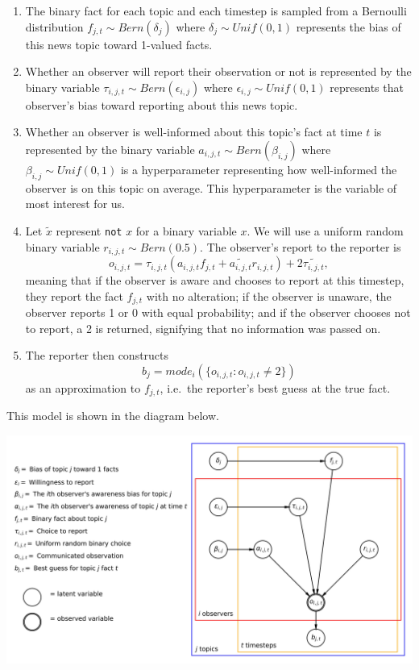 \documentclass[11pt]{article}
\providecommand{\tightlist}{%
      \setlength{\itemsep}{0pt}\setlength{\parskip}{0pt}}
\begin{document}
\begin{enumerate}
\def\labelenumi{\arabic{enumi}.}
\tightlist
\item
  The binary fact for each topic and each timestep is sampled from a
  Bernoulli distribution \(f_{j,t} \sim Bern(\delta_j)\) where
  \(\delta_j\sim Unif(0,1)\) represents the bias of this news topic
  toward 1-valued facts.
\item
  Whether an observer will report their observation or not is
  represented by the binary variable
  \(\tau_{i,j,t} \sim Bern(\epsilon_{i,j})\) where
  \(\epsilon_{i,j}\sim Unif(0,1)\) represents that observer's bias
  toward reporting about this news topic.
\item
  Whether an observer is well-informed about this topic's fact at time
  \(t\) is represented by the binary variable
  \(a_{i,j,t} \sim Bern(\beta_{i,j})\) where
  \(\beta_{i,j}\sim Unif(0,1)\) is a hyperparameter representing how
  well-informed the observer is on this topic on average. This
  hyperparameter is the variable of most interest for us.
\item
  Let \(\tilde{x}\) represent \texttt{not} \(x\) for a binary variable
  \(x\). We will use a uniform random binary variable
  \(r_{i,j,t} \sim Bern(0.5)\). The observer's report to the reporter is
  \[o_{i,j,t} = \tau_{i,j,t}(a_{i,j,t}f_{j,t} + \tilde{a_{i,j,t}}r_{i,j,t}) + 2\tilde{\tau_{i,j,t}},\]
  meaning that if the observer is aware and chooses to report at this
  timestep, they report the fact \(f_{j,t}\) with no alteration; if the
  observer is unaware, the observer reports 1 or 0 with equal
  probability; and if the observer chooses not to report, a 2 is
  returned, signifying that no information was passed on.
\item
  The reporter then constructs
  \[b_j = mode_i(\{o_{i,j,t} : o_{i,j,t}\neq2\})\] as an approximation
  to \(f_{j,t}\), i.e.~the reporter's best guess at the true fact.
\end{enumerate}

This model is shown in the diagram below.

    \includegraphics{../Images/reporting_network.jpg}
\end{document}
